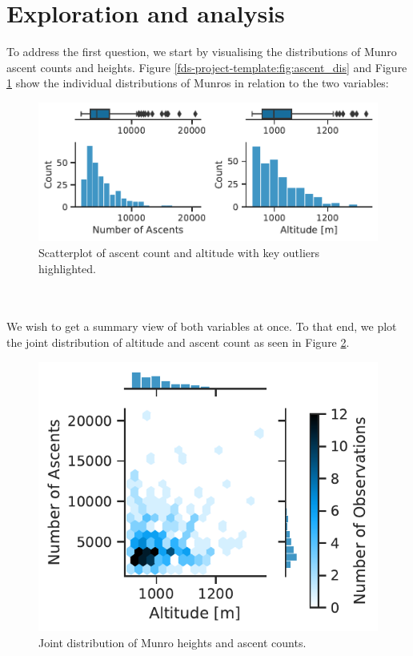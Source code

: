 \documentclass[11pt,a4paper]{article}
\begin{document}

\section{Exploration and  analysis}

To address the first question, we start by visualising the distributions of Munro ascent counts and heights. Figure \ref{fds-project-template:fig:ascent_dis} and Figure \ref{fds-project-template:fig:box_dist} show the individual distributions of Munros in relation to the two variables:
\begin{figure} [h!]
  \centering
  \includegraphics{report/box_dist.pdf}
  \caption{Scatterplot of ascent count and altitude with key outliers highlighted.}
  \label{fds-project-template:fig:box_dist}
\end{figure} \\ \\
We wish to get a summary view of both variables at once. To that end, we plot the joint distribution of altitude and ascent count as seen in Figure \ref{fds-project-template:fig:heatmap}.
\begin{figure} [h!]
  \centering
  \includegraphics{report/heatmap_joint_distribution.pdf}
  \caption{Joint distribution of Munro heights and ascent counts.}
  \label{fds-project-template:fig:heatmap}
\end{figure}
\end{document}
